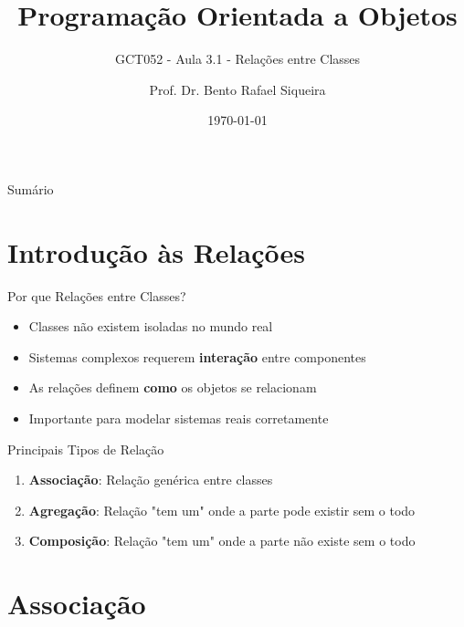 \documentclass[aspectratio=169]{beamer}
\title{Programação Orientada a Objetos}
\subtitle{GCT052 - Aula 3.1 - Relações entre Classes}
\author{Prof. Dr. Bento Rafael Siqueira}
\institute{Universidade Federal de Lavras\\Departamento de Ciência da Computação}
\date{\today}
\begin{document}
\begin{frame}
\titlepage
\end{frame}

\begin{frame}{Sumário}
\tableofcontents
\end{frame}

\section{Introdução às Relações}

\begin{frame}{Por que Relações entre Classes?}
\begin{itemize}
\item Classes não existem isoladas no mundo real
\item Sistemas complexos requerem \textbf{interação} entre componentes
\item As relações definem \textbf{como} os objetos se relacionam
\item Importante para modelar sistemas reais corretamente
\end{itemize}

\vspace{0.5cm}
\begin{block}{Principais Tipos de Relação}
\begin{enumerate}
\item \textbf{Associação}: Relação genérica entre classes
\item \textbf{Agregação}: Relação "tem um" onde a parte pode existir sem o todo
\item \textbf{Composição}: Relação "tem um" onde a parte não existe sem o todo
\end{enumerate}
\end{block}
\end{frame}

\section{Associação}
\end{document}
